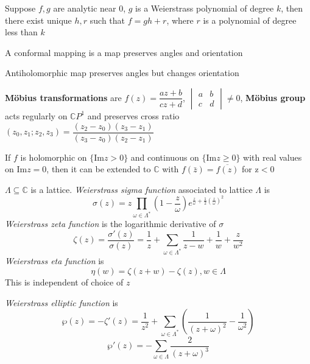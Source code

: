 \documentclass[main]{subfiles}
\begin{document}
\begin{theorem}
Suppose $f,g$ are analytic near $0$, $g$ is a Weierstrass polynomial of degree $k$, then there exist unique $h,r$ such that $f=gh+r$, where $r$ is a polynomial of degree less than $k$
\end{theorem}

\begin{definition}
A conformal mapping is a map preserves angles and orientation
\end{definition}

\begin{note}
Antiholomorphic map preserves angles but changes orientation
\end{note}

\begin{definition}
\textbf{M\"obius transformations} are $f(z)=\dfrac{az+b}{cz+d}$, $\begin{vmatrix}
a&b\\
c&d
\end{vmatrix}\neq0$, \textbf{M\"obius group} acts regularly on $\mathbb CP^1$ and preserves cross ratio $(z_0,z_1;z_2,z_3)=\dfrac{(z_2-z_0)(z_3-z_1)}{(z_3-z_0)(z_2-z_1)}$
\end{definition}

\begin{lemma}\label{Schwarz reflection principle}
If $f$ is holomorphic on $\{\mathrm{Im}z>0\}$ and continuous on $\{\mathrm{Im}z\geq0\}$ with real values on $\mathrm{Im}z=0$, then it can be extended to $\mathbb C$ with $f(\bar z)=\overline{f(z)}$ for $\mathrm{z}<0$
\end{lemma}

\begin{definition}
$\Lambda\subseteq \mathbb C$ is a lattice. \textit{Weierstrass sigma function} associated to lattice $\Lambda$ is
\[\sigma(z)=z\prod_{\omega\in\Lambda^*}\left(1-\frac{z}{\omega}\right)e^{\frac{z}{\omega}+\frac{1}{2}(\frac{z}{\omega})^2}\]
\textit{Weierstrass zeta function} is the logarithmic derivative of $\sigma$
\[\zeta(z)=\frac{\sigma'(z)}{\sigma(z)}=\frac{1}{z}+\sum_{\omega\in\Lambda^*}\frac{1}{z-w}+\frac{1}{w}+\frac{z}{w^2}\]
\textit{Weierstrass eta function} is
\[\eta(w)=\zeta(z+w)-\zeta(z), w\in\Lambda\]
This is independent of choice of $z$ \par
\textit{Weierstrass elliptic function} is
\[\wp(z)=-\zeta'(z)=\frac{1}{z^2}+\sum_{\omega\in\Lambda^*}\left(\frac{1}{(z+\omega)^2}-\frac{1}{\omega^2}\right)\]
\[\wp'(z)=-\sum_{\omega\in\Lambda}\frac{2}{(z+\omega)^3}\]
\end{definition}
\end{document}

